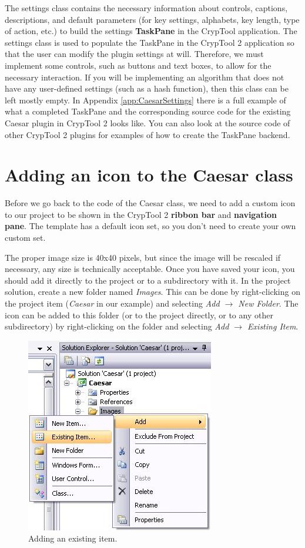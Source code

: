 The settings class contains the necessary information about controls, captions, descriptions, and default parameters (for key settings, alphabets, key length, type of action, etc.) to build the settings \textbf{TaskPane} in the CrypTool application. The settings class is used to populate the TaskPane in the CrypTool 2 application so that the user can modify the plugin settings at will. Therefore, we must implement some controls, such as buttons and text boxes, to allow for the necessary interaction. If you will be implementing an algorithm that does not have any user-defined settings (such as a hash function), then this class can be left mostly empty. In Appendix \ref{app:CaesarSettings} there is a full example of what a completed TaskPane and the corresponding source code for the existing Caesar plugin in CrypTool 2 looks like. You can also look at the source code of other CrypTool 2 plugins for examples of how to create the TaskPane backend.
\clearpage

\section{Adding an icon to the Caesar class}
\label{sec:AddingAnIconToTheCaesarClass}

Before we go back to the code of the Caesar class, we need to add a custom icon to our project to be shown in the CrypTool 2 \textbf{ribbon bar} and \textbf{navigation pane}. The template has a default icon set, so you don't need to create your own custom set.

The proper image size is 40x40 pixels, but since the image will be rescaled if necessary, any size is technically acceptable. Once you have saved your icon, you should add it directly to the project or to a subdirectory with it. In the project solution, create a new folder named \textit{Images}. This can be done by right-clicking on the project item (\textit{Caesar} in our example) and selecting \textit{Add $\rightarrow$ New Folder}. The icon can be added to this folder (or to the project directly, or to any other subdirectory) by right-clicking on the folder and selecting \textit{Add $\rightarrow$ Existing Item}.

\begin{figure}[h!]
	\centering
		\includegraphics{figures/add_existing_item.jpg}
	\caption{Adding an existing item.}
	\label{fig:add_existing_item}
\end{figure}
\clearpage

